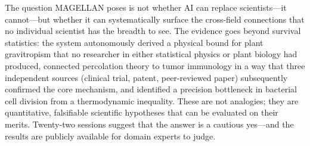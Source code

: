 The question MAGELLAN poses is not whether AI can replace scientists---it cannot---but whether it can systematically surface the cross-field connections that no individual scientist has the breadth to see. The evidence goes beyond survival statistics: the system autonomously derived a physical bound for plant gravitropism that no researcher in either statistical physics or plant biology had produced, connected percolation theory to tumor immunology in a way that three independent sources (clinical trial, patent, peer-reviewed paper) subsequently confirmed the core mechanism, and identified a precision bottleneck in bacterial cell division from a thermodynamic inequality. These are not analogies; they are quantitative, falsifiable scientific hypotheses that can be evaluated on their merits. Twenty-two sessions suggest that the answer is a cautious yes---and the results are publicly available for domain experts to judge.
